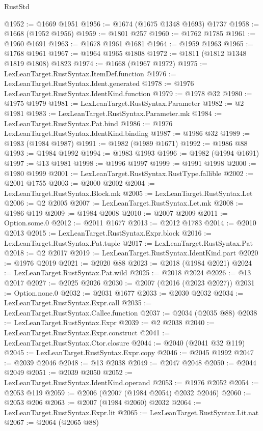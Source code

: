 \begin{lexlean}{RustStd}
\begin{coremodule}
@1952 := @1669 @1951
@1956 := @1674 (@1675 @1348 @1693) @1737
@1958 := @1668 (@1952 @1956)
@1959 := @1801 @257
@1960 := @1762 @1785
@1961 := @1960 @1691
@1963 := @1678 @1961 @1681
@1964 := @1959 @1963
@1965 := @1768 @1961
@1967 := @1964 @1965 @1808
@1972 := @1811 (@1812 @1348 @1819 @1808) @1823
@1974 := @1668 (@1967 @1972)
@1975 := LexLeanTarget.RustSyntax.ItemDef.function
@1976 := LexLeanTarget.RustSyntax.Ident.generated
@1978 := @1976 LexLeanTarget.RustSyntax.IdentKind.function
@1979 := @1978 @32
@1980 := @1975 @1979
@1981 := LexLeanTarget.RustSyntax.Parameter
@1982 := @2 @1981
@1983 := LexLeanTarget.RustSyntax.Parameter.mk
@1984 := LexLeanTarget.RustSyntax.Pat.bind
@1986 := @1976 LexLeanTarget.RustSyntax.IdentKind.binding
@1987 := @1986 @32
@1989 := @1983 (@1984 @1987)
@1991 := @1982 (@1989 @1671)
@1992 := @1986 @88
@1993 := @1984 @1992
@1994 := @1983 @1993
@1996 := @1982 (@1994 @1691)
@1997 := @13 @1981
@1998 := @1996 @1997
@1999 := @1991 @1998
@2000 := @1980 @1999
@2001 := LexLeanTarget.RustSyntax.RustType.fallible
@2002 := @2001 @1755
@2003 := @2000 @2002
@2004 := LexLeanTarget.RustSyntax.Block.mk
@2005 := LexLeanTarget.RustSyntax.Let
@2006 := @2 @2005
@2007 := LexLeanTarget.RustSyntax.Let.mk
@2008 := @1986 @119
@2009 := @1984 @2008
@2010 := @2007 @2009
@2011 := Option.some.{0}
@2012 := @2011 @1677
@2013 := @2012 @1783
@2014 := @2010 @2013
@2015 := LexLeanTarget.RustSyntax.Expr.block
@2016 := LexLeanTarget.RustSyntax.Pat.tuple
@2017 := LexLeanTarget.RustSyntax.Pat
@2018 := @2 @2017
@2019 := LexLeanTarget.RustSyntax.IdentKind.part
@2020 := @1976 @2019
@2021 := @2020 @88
@2023 := @2018 (@1984 @2021)
@2024 := LexLeanTarget.RustSyntax.Pat.wild
@2025 := @2018 @2024
@2026 := @13 @2017
@2027 := @2025 @2026
@2030 := @2007 (@2016 (@2023 @2027))
@2031 := Option.none.{0}
@2032 := @2031 @1677
@2033 := @2030 @2032
@2034 := LexLeanTarget.RustSyntax.Expr.call
@2035 := LexLeanTarget.RustSyntax.Callee.function
@2037 := @2034 (@2035 @88)
@2038 := LexLeanTarget.RustSyntax.Expr
@2039 := @2 @2038
@2040 := LexLeanTarget.RustSyntax.Expr.construct
@2041 := LexLeanTarget.RustSyntax.Ctor.closure
@2044 := @2040 (@2041 @32 @119)
@2045 := LexLeanTarget.RustSyntax.Expr.copy
@2046 := @2045 @1992
@2047 := @2039 @2046
@2048 := @13 @2038
@2049 := @2047 @2048
@2050 := @2044 @2049
@2051 := @2039 @2050
@2052 := LexLeanTarget.RustSyntax.IdentKind.operand
@2053 := @1976 @2052
@2054 := @2053 @119
@2059 := @2006 (@2007 (@1984 @2054) @2032 @2046)
@2060 := @2053 @206
@2063 := @2007 (@1984 @2060) @2032
@2064 := LexLeanTarget.RustSyntax.Expr.lit
@2065 := LexLeanTarget.RustSyntax.Lit.nat
@2067 := @2064 (@2065 @88)

\end{coremodule}
\end{lexlean}
